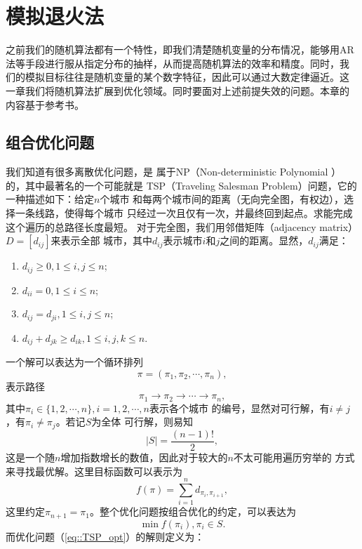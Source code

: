 \chapter{模拟退火法}

之前我们的随机算法都有一个特性，即我们清楚随机变量的分布情况，能够用AR
法等手段进行服从指定分布的抽样，从而提高随机算法的效率和精度。同时，我
们的模拟目标往往是随机变量的某个数字特征，因此可以通过大数定律逼近。这
一章我们将随机算法扩展到优化领域。同时要面对上述前提失效的问题。本章的
内容基于参考书\cite{Kanglishan1994}。

\section{组合优化问题}
我们知道有很多离散优化问题，是
属于NP（Non-deterministic Polynomial ）的，其中最著名的一个可能就是
TSP（Traveling Salesman Problem）问题，它的一种描述如下：给定$n$个城市
和每两个城市间的距离（无向完全图，有权边），选择一条线路，使得每个城市
只经过一次且仅有一次，并最终回到起点。求能完成这个遍历的总路径长度最短。
对于完全图，我们用邻借矩阵（adjacency matrix）$D = [d_{ij}]$来表示全部
城市，其中$d_{ij}$表示城市$i$和$j$之间的距离。显然，$d_{ij}$满足：
\begin{enumerate}
\item $d_{ij} \geq 0, 1 \leq i, j \leq n$;
\item $d_{ii} = 0, 1 \leq i \leq n$;
\item $d_{ij} = d_{ji}, 1 \leq i, j \leq n$;
\item $d_{ij} + d_{jk} \geq d_{ik}, 1 \leq i, j, k \leq n$.
\end{enumerate}
一个解可以表达为一个循环排列
$$
\pi = (\pi_1, \pi_2, \cdots, \pi_n),
$$
表示路径
$$
\pi_1 \to \pi_2 \to \cdots \to \pi_n,
$$
其中$\pi_i \in \{1, 2, \cdots, n\}, i = 1, 2, \cdots, n$表示各个城市
的编号，显然对可行解，有$i \neq j$，有$\pi_i \neq \pi_j$。若记$S$为全体
可行解，则易知
\begin{equation}
  |S| = \frac{(n - 1)!}{2},
\end{equation}
这是一个随$n$增加指数增长的数值，因此对于较大的$n$不太可能用遍历穷举的
方式来寻找最优解。这里目标函数可以表示为
\begin{equation}
  f(\pi) = \sum_{i = 1}^n d_{\pi_i, \pi_{i + 1}},
\end{equation}
这里约定$\pi_{n + 1} = \pi_1$。整个优化问题按组合优化的约定，可以表达为
\begin{equation}
  \min f(\pi_i), \pi_i \in S.
\label{eq::TSP_opt}
\end{equation}
而优化问题（\ref{eq::TSP_opt}）的解则定义为：


